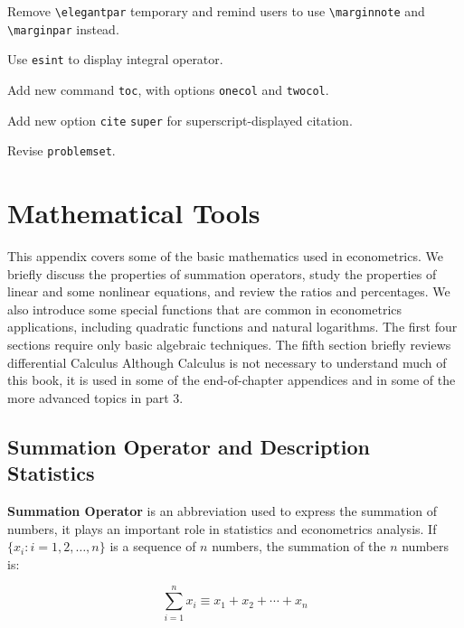 \documentclass[11pt]{elegantbook}
\begin{document}

\begin{change}
  \item Remove \lstinline{\elegantpar} temporary and remind users to use \lstinline{\marginnote} and \lstinline{\marginpar} instead.
  \item Use \lstinline{esint} to display integral operator.
  \item Add new command \lstinline{toc}, with options  \lstinline{onecol} and \lstinline{twocol}.
  \item Add new option \lstinline{cite} \lstinline{super} for superscript-displayed citation.
  \item Revise \lstinline{problemset}.
\end{change}

\nocite{en2,en3}

\printbibliography[heading=bibintoc, title=\ebibname]

\appendix

\chapter{Mathematical Tools}

This appendix covers some of the basic mathematics used in econometrics. We briefly discuss the properties of summation operators, study the properties of linear and some nonlinear equations, and review the ratios and percentages. We also introduce some special functions that are common in econometrics applications, including quadratic functions and natural logarithms. The first four sections require only basic algebraic techniques. The fifth section briefly reviews differential Calculus Although Calculus is not necessary to understand much of this book, it is used in some of the end-of-chapter appendices and in some of the more advanced topics in part 3.

\section{Summation Operator and Description Statistics}

\textbf{Summation Operator} is an abbreviation used to express the summation of numbers, it plays an important role in statistics and econometrics analysis. If $\{x_i: i=1, 2, \ldots, n\}$ is a sequence of $n$ numbers, the summation of the $n$ numbers is:

\begin{equation}
\sum_{i=1}^n x_i \equiv x_1 + x_2 +\cdots + x_n
\end{equation}
\end{document}
